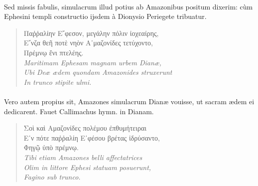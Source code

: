 \documentclass[a4paper, 11pt, oneside, polutonikogreek, latin]{article}
\begin{document}
\paragraph{}
Sed missis fabulis, simulacrum illud potius ab Amazonibus positum dixerim: cùm Ephesini templi constructio ijsdem à Dionysio Periegete tribuatur.
\begin{quote}
\hspace*{0mm}Παῤῥαλίην Ε῎φεσον, μεγάλην πόλιν ἰοχεαίρης,\\
\hspace*{0mm}Ε῎νζα θεῆ ποτὲ νηὸν Α᾽μαζονίδες τετύχοντο,\\
\hspace*{0mm}Πρέμνῳ ἔνι πτελέης.\\

\hspace*{0mm}\emph{Maritimam Ephesam magnam urbem Dianæ,}\\
\hspace*{0mm}\emph{Ubi Deæ ædem quondam Amazonides struxerunt}\\
\hspace*{0mm}\emph{In trunco stipite ulmi.}\\
\end{quote}
\vspace*{-8mm}
\paragraph{}
Vero autem propius sit, Amazones simulacrum Dianæ vouisse, ut sacram ædem ei dedicarent. Fauet Callimachus hymn. in Dianam.
\begin{quote}
\hspace*{0mm}Σοὶ καὶ Αμαζονίδες πολέμου ἐπθυμήτειραι\\
\hspace*{0mm}Ε᾽ν πότε παῤῥαλίη Ε᾽φέσου βρέτας ἱδρύσαντο,\\
\hspace*{0mm}Φηγῷ ὑπὸ πρέμνῳ.\\

\hspace*{0mm}\emph{Tibi etiam Amazones belli affectatrices}\\
\hspace*{0mm}\emph{Olim in littore Ephesi statuam posuerunt,}\\
\hspace*{0mm}\emph{Fagino sub trunco.}\\
\end{quote}
\vspace*{-8mm}
\end{document}

